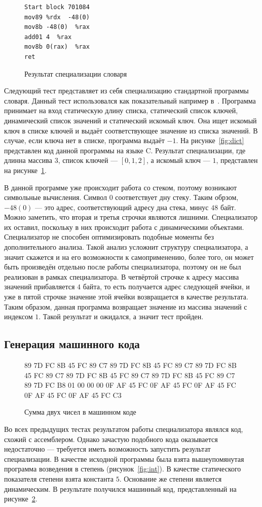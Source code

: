 \begin{figure}
\begin{lstlisting}[xleftmargin = 20pt]
Start block 701084
mov89 %rdx  -48(0) 
mov8b -48(0)  %rax 
add01 4  %rax 
mov8b 0(rax)  %rax 
ret
\end{lstlisting}
\caption{Результат специализации словаря}
\label{fig:dictres}
\end{figure}
Следующий тест представляет из себя специализацию стандартной программы словаря.
Данный тест использовался как показательный например в~\cite{PEAPG}.
Программа принимает на вход статическую длину списка, статический список ключей, динамический список значений и статический искомый ключ.
Она ищет искомый ключ в списке ключей и выдаёт соответствующее значение из списка значений. В случае, если ключа нет в списке, программа выдаёт $-1$. На рисунке~\ref{fig:dict} представлен код данной программы на языке \textsf{C}.
Результат специализации, где длинна массива $3$, список ключей --- $[0, 1, 2]$, а искомый ключ --- $1$, представлен на рисунке~\ref{fig:dictres}.

В данной программе уже происходит работа со стеком, поэтому возникают символьные вычисления.
Символ $0$ соответствует дну стеку.
Таким обрзом, $-48(0)$ --- это адрес, соответствующий адресу дна стека, минус $48$ байт. Можно заметить, что вторая и третья строчки являются лишними. Специализатор их оставил, поскольку в них происходит работа с динамическими объектами.
Специализатор не способен оптимизировать подобные моменты без дополнительного анализа.
Такой анализ усложнит структуру специализатора, а значит скажется и на его возможности к самоприменению, более того,
он может быть произведён отдельно после работы специализатора, поэтому он не был реализован в рамках специализатора.
В четвёртой строчке к адресу массива значений прибавляется $4$ байта, то есть получается адрес следующей ячейки, и уже в пятой строчке значение этой ячейки возвращается в качестве результата. Таким образом, данная программа возвращает значение из массива значений с индексом $1$. Такой результат и ожидался, а значит тест пройден.


\subsection{ Генерация машинного кода}
\begin{figure}
89 7D FC 8B 45 FC 89 C7 89 7D FC 8B 45 FC 89 C7 89 7D FC 8B 45 FC 89 C7 89 7D FC 8B 45 FC 89 C7 89 7D FC 8B 45 FC 89 C7 89 7D FC B8 01 00 00 00 0F AF 45 FC 0F AF 45 FC 0F AF 45 FC 0F AF 45 FC 0F AF 45 FC C3
\caption{ Сумма двух чисел в машинном коде}
\label{fig:pow}
\end{figure}
Во всех предыдущих тестах результатом работы специализатора являлся код, схожий с ассемблером. Однако зачастую подобного кода оказывается недостаточно --- требуется иметь возможность запустить результат специализации. В качестве исходной программы была взята вышеупомянутая программа возведения в степень (рисунок~\ref{fig:int}). В качестве статического показателя степени взята константа $5$. Основание же степени является динамическим. В результате получился машинный код, представленный на рисунке~\ref{fig:pow}.

